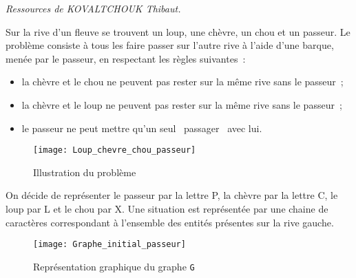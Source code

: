 \begin{flushright}
\textit{Ressources de KOVALTCHOUK Thibaut.}
\end{flushright}
\setcounter{numques}{0}
Sur la rive d'un fleuve se trouvent un loup, une chèvre, un chou et un passeur. Le problème consiste à tous les faire passer sur l'autre rive à l'aide d'une barque, menée par le passeur, en respectant les règles suivantes~:
\begin{itemize}
	\item la chèvre et le chou ne peuvent pas rester sur la même rive sans le passeur~;
	\item la chèvre et le loup ne peuvent pas rester sur la même rive sans le passeur~;
	\item le passeur ne peut mettre qu'un seul \og~passager~\fg{} avec lui.
\end{itemize}

\begin{figure}[h]
	\begin{center}
		\texttt{[image: Loup\_chevre\_chou\_passeur]}
	\end{center}
	\caption{Illustration du problème}
\end{figure}

On décide de représenter le passeur par la lettre P, la chèvre par la lettre C, le loup par L et le chou par X. Une situation est représentée par une chaine de caractères correspondant à l'ensemble des entités présentes sur la rive gauche.


\begin{figure}[h]
	\begin{center}
		\texttt{[image: Graphe\_initial\_passeur]}
	\end{center}
	\caption{Représentation graphique du graphe \texttt{G}}
\end{figure}


